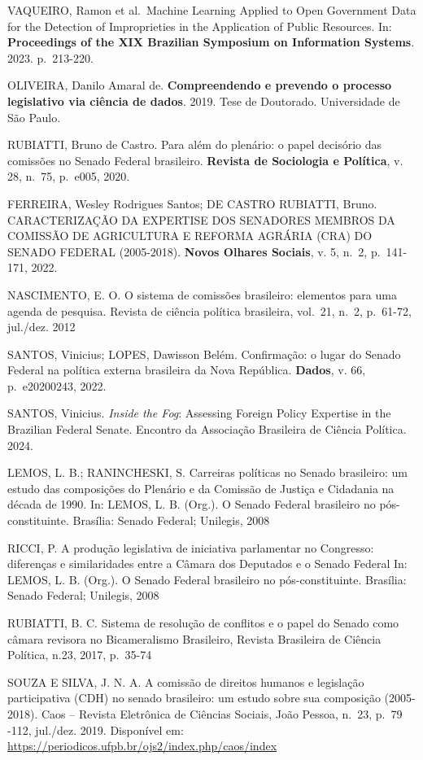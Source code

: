 \documentclass{article}
\begin{document}
VAQUEIRO, Ramon et al.~Machine Learning Applied to Open Government Data
for the Detection of Improprieties in the Application of Public
Resources. In: \textbf{Proceedings of the XIX Brazilian Symposium on
Information Systems}. 2023. p.~213-220.

OLIVEIRA, Danilo Amaral de. \textbf{Compreendendo e prevendo o processo
legislativo via ciência de dados}. 2019. Tese de Doutorado. Universidade
de São Paulo.

RUBIATTI, Bruno de Castro. Para além do plenário: o papel decisório das
comissões no Senado Federal brasileiro. \textbf{Revista de Sociologia e
Política}, v. 28, n.~75, p.~e005, 2020.

FERREIRA, Wesley Rodrigues Santos; DE CASTRO RUBIATTI, Bruno.
CARACTERIZAÇÃO DA EXPERTISE DOS SENADORES MEMBROS DA COMISSÃO DE
AGRICULTURA E REFORMA AGRÁRIA (CRA) DO SENADO FEDERAL (2005-2018).
\textbf{Novos Olhares Sociais}, v. 5, n.~2, p.~141-171, 2022.

NASCIMENTO, E. O. O sistema de comissões brasileiro: elementos para uma
agenda de pesquisa. Revista de ciência política brasileira, vol.~21,
n.~2, p.~61-72, jul./dez. 2012

SANTOS, Vinicius; LOPES, Dawisson Belém. Confirmação: o lugar do Senado
Federal na política externa brasileira da Nova República.
\textbf{Dados}, v. 66, p.~e20200243, 2022.

SANTOS, Vinicius. \emph{Inside the Fog}: Assessing Foreign Policy
Expertise in the Brazilian Federal Senate. Encontro da Associação
Brasileira de Ciência Política. 2024.

LEMOS, L. B.; RANINCHESKI, S. Carreiras políticas no Senado brasileiro:
um estudo das composições do Plenário e da Comissão de Justiça e
Cidadania na década de 1990. In: LEMOS, L. B. (Org.). O Senado Federal
brasileiro no pós-constituinte. Brasília: Senado Federal; Unilegis, 2008

RICCI, P. A produção legislativa de iniciativa parlamentar no Congresso:
diferenças e similaridades entre a Câmara dos Deputados e o Senado
Federal In: LEMOS, L. B. (Org.). O Senado Federal brasileiro no
pós-constituinte. Brasília: Senado Federal; Unilegis, 2008

RUBIATTI, B. C. Sistema de resolução de conflitos e o papel do Senado
como câmara revisora no Bicameralismo Brasileiro, Revista Brasileira de
Ciência Política, n.23, 2017, p.~35-74

SOUZA E SILVA, J. N. A. A comissão de direitos humanos e legislação
participativa (CDH) no senado brasileiro: um estudo sobre sua composição
(2005-2018). Caos -- Revista Eletrônica de Ciências Sociais, João
Pessoa, n.~23, p.~79 -112, jul./dez. 2019. Disponível em:
\url{https://periodicos.ufpb.br/ojs2/index.php/caos/index}
\end{document}
